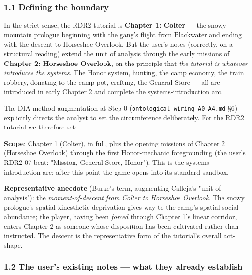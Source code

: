 \documentclass[11pt]{report}
\begin{document}
\subsubsection{1.1 Defining the boundary}


In the strict sense, the RDR2 tutorial is \textbf{Chapter 1: Colter} — the snowy mountain prologue beginning with the gang's flight from Blackwater and ending with the descent to Horseshoe Overlook. But the user's notes (correctly, on a structural reading) extend the unit of analysis through the early missions of \textbf{Chapter 2: Horseshoe Overlook}, on the principle that \textit{the tutorial is whatever introduces the systems}. The Honor system, hunting, the camp economy, the train robbery, donating to the camp pot, crafting, the General Store — all are introduced in early Chapter 2 and complete the systems-introduction arc.


The DIA-method augmentation at Step 0 (\texttt{ontological-\discretionary{}{}{}wiring-\discretionary{}{}{}A0-\discretionary{}{}{}A4.\discretionary{}{}{}md} §6) explicitly directs the analyst to set the circumference deliberately. For the RDR2 tutorial we therefore set:


\begin{diabox}
\textbf{Scope}: Chapter 1 (Colter), in full, plus the opening missions of Chapter 2 (Horseshoe Overlook) through the first Honor-mechanic foregrounding (the user's RDR2-07 beat: "Mission, General Store, Honor"). This is the systems-introduction arc; after this point the game opens into its standard sandbox.

\end{diabox}


\begin{diabox}
\textbf{Representative anecdote} (Burke's term, augmenting Calleja's "unit of analysis"): the \textit{moment-of-descent from Colter to Horseshoe Overlook}. The snowy prologue's spatial-kinesthetic deprivation gives way to the camp's spatial-social abundance; the player, having been \textit{forced} through Chapter 1's linear corridor, enters Chapter 2 as someone whose disposition has been cultivated rather than instructed. The descent is the representative form of the tutorial's overall act-shape.

\end{diabox}


\subsubsection{1.2 The user's existing notes — what they already establish}
\end{document}
